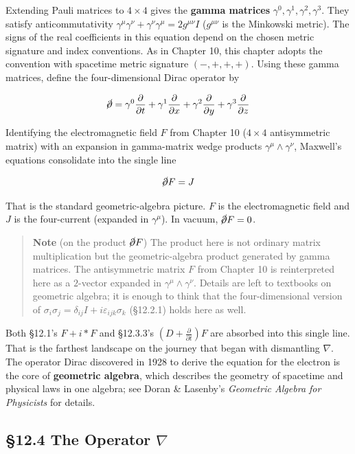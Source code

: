 Extending Pauli matrices to \(4\times4\) gives the \textbf{gamma
matrices} \(\gamma^0,\gamma^1,\gamma^2,\gamma^3\). They satisfy
anticommutativity
\(\gamma^\mu\gamma^\nu + \gamma^\nu\gamma^\mu = 2g^{\mu\nu}I\)
(\(g^{\mu\nu}\) is the Minkowski metric). The signs of the real
coefficients in this equation depend on the chosen metric signature and
index conventions. As in Chapter 10, this chapter adopts the convention
with spacetime metric signature \((-,+,+,+)\). Using these gamma
matrices, define the four-dimensional Dirac operator by

\[\cancel{\partial} = \gamma^0\frac{\partial}{\partial t} + \gamma^1\frac{\partial}{\partial x} + \gamma^2\frac{\partial}{\partial y} + \gamma^3\frac{\partial}{\partial z}\]

Identifying the electromagnetic field \(F\) from Chapter 10
(\(4\times4\) antisymmetric matrix) with an expansion in gamma-matrix
wedge products \(\gamma^\mu\!\wedge\!\gamma^\nu\), Maxwell's equations
consolidate into the single line

\[\cancel{\partial} F = J\]

That is the standard geometric-algebra picture. \(F\) is the
electromagnetic field and \(J\) is the four-current (expanded in
\(\gamma^\mu\)). In vacuum, \(\cancel{\partial} F = 0\).

\begin{quote}
\textbf{Note} (on the product \(\cancel{\partial} F\)) The product here
is not ordinary matrix multiplication but the geometric-algebra product
generated by gamma matrices. The antisymmetric matrix \(F\) from Chapter
10 is reinterpreted here as a \(2\)-vector expanded in
\(\gamma^\mu\!\wedge\!\gamma^\nu\). Details are left to textbooks on
geometric algebra; it is enough to think that the four-dimensional
version of
\(\sigma_i\sigma_j = \delta_{ij}I + i\varepsilon_{ijk}\sigma_k\)
(§12.2.1) holds here as well.
\end{quote}

Both §12.1's \(F + i\ast F\) and §12.3.3's
\((D + \frac{\partial}{\partial t})F\) are absorbed into this single
line. That is the farthest landscape on the journey that began with
dismantling \(\nabla\). The operator Dirac discovered in 1928 to derive
the equation for the electron is the core of \textbf{geometric algebra},
which describes the geometry of spacetime and physical laws in one
algebra; see Doran \& Lasenby's \emph{Geometric Algebra for Physicists}
for details.

\hypertarget{the-operator-nabla}{%
\subsection{\texorpdfstring{§12.4 The Operator
\(\nabla\)}{§12.4 The Operator \textbackslash nabla}}\label{the-operator-nabla}}

